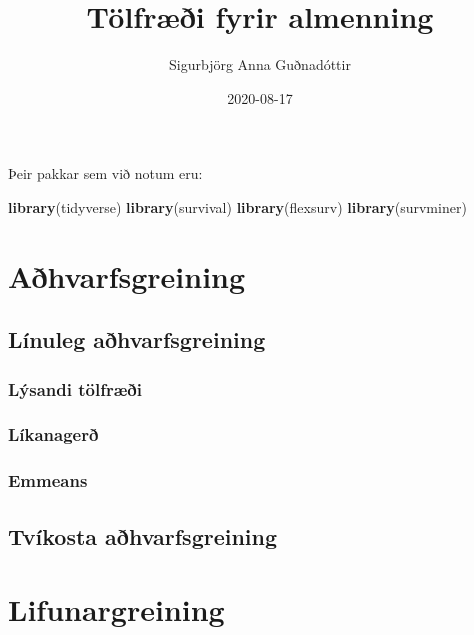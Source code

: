 \documentclass[
]{book}
\title{Tölfræði fyrir almenning}
\author{Sigurbjörg Anna Guðnadóttir}
\date{2020-08-17}
\newenvironment{Shaded}{\begin{snugshade}}{\end{snugshade}}
\newcommand{\KeywordTok}[1]{\textcolor[rgb]{0.13,0.29,0.53}{\textbf{#1}}}
\newcommand{\NormalTok}[1]{#1}
\begin{document}
\maketitle

{
\setcounter{tocdepth}{1}
\tableofcontents
}
Þeir pakkar sem við notum eru:

\begin{Shaded}
\begin{Highlighting}[]
\KeywordTok{library}\NormalTok{(tidyverse)}
\KeywordTok{library}\NormalTok{(survival)}
\KeywordTok{library}\NormalTok{(flexsurv)}
\KeywordTok{library}\NormalTok{(survminer)}
\end{Highlighting}
\end{Shaded}

\hypertarget{reg}{%
\chapter{Aðhvarfsgreining}\label{reg}}

\hypertarget{luxednuleg-auxf0hvarfsgreining}{%
\section{Línuleg aðhvarfsgreining}\label{luxednuleg-auxf0hvarfsgreining}}

\hypertarget{luxfdsandi-tuxf6lfruxe6uxf0i}{%
\subsection{Lýsandi tölfræði}\label{luxfdsandi-tuxf6lfruxe6uxf0i}}

\hypertarget{luxedkanageruxf0}{%
\subsection{Líkanagerð}\label{luxedkanageruxf0}}

\hypertarget{emmeans}{%
\subsection{Emmeans}\label{emmeans}}

\hypertarget{tvuxedkosta-auxf0hvarfsgreining}{%
\section{Tvíkosta aðhvarfsgreining}\label{tvuxedkosta-auxf0hvarfsgreining}}

\hypertarget{lif}{%
\chapter{Lifunargreining}\label{lif}}
\end{document}
